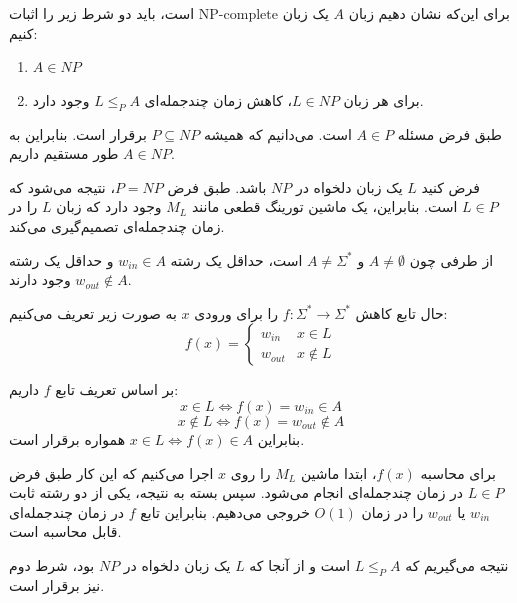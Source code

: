 برای این‌که نشان دهیم زبان $A$ یک زبان $\text{NP-complete}$ است، باید دو شرط زیر را اثبات کنیم:
\begin{enumerate}
    \item $A \in NP$
    \item برای هر زبان $L \in NP$، کاهش زمان چندجمله‌ای $L \le_P A$ وجود دارد.
\end{enumerate}

طبق فرض مسئله $A \in P$ است. می‌دانیم که همیشه $P \subseteq NP$ برقرار است. بنابراین به طور مستقیم داریم $A \in NP$.

فرض کنید $L$ یک زبان دلخواه در $NP$ باشد. طبق فرض $P = NP$، نتیجه می‌شود که $L \in P$ است. بنابراین، یک ماشین تورینگ قطعی مانند $M_L$ وجود دارد که زبان $L$ را در زمان چندجمله‌ای تصمیم‌گیری می‌کند.

از طرفی چون $A \neq \emptyset$ و $A \neq \Sigma^*$ است، حداقل یک رشته $w_{in} \in A$ و حداقل یک رشته $w_{out} \notin A$ وجود دارند.

حال تابع کاهش $f: \Sigma^* \to \Sigma^*$ را برای ورودی $x$ به صورت زیر تعریف می‌کنیم:
\[
f(x) = \begin{cases} 
w_{in} & x \in L  \\
w_{out} & x \notin L 
\end{cases}
\]

    بر اساس تعریف تابع $f$ داریم:
    \[
    x \in L \iff f(x) = w_{in} \in A
    \]
    \[
    x \notin L \iff f(x) = w_{out} \notin A
    \]
    بنابراین $x \in L \iff f(x) \in A$ همواره برقرار است.

    برای محاسبه $f(x)$، ابتدا ماشین $M_L$ را روی $x$ اجرا می‌کنیم که این کار طبق فرض $L \in P$ در زمان چندجمله‌ای انجام می‌شود. سپس بسته به نتیجه، یکی از دو رشته ثابت $w_{in}$ یا $w_{out}$ را در زمان $O(1)$ خروجی می‌دهیم. بنابراین تابع $f$ در زمان چندجمله‌ای قابل محاسبه است.

نتیجه می‌گیریم که $L \le_P A$ است و از آنجا که $L$ یک زبان دلخواه در $NP$ بود، شرط دوم نیز برقرار است.
